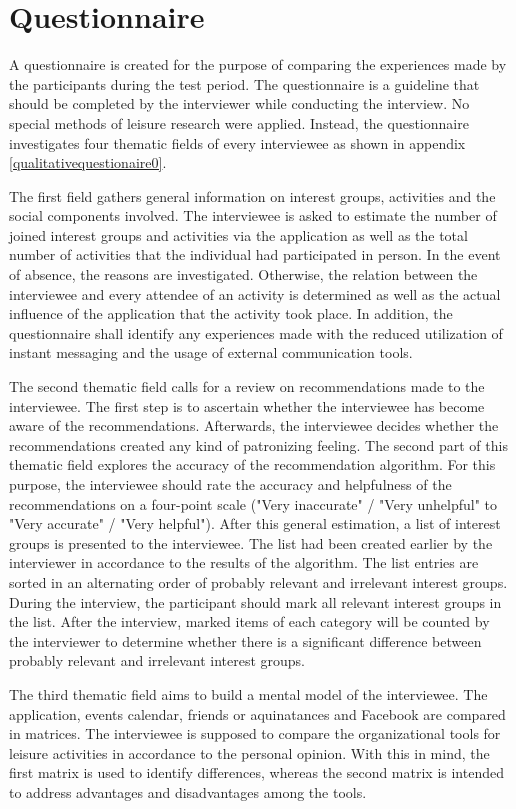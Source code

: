 \documentclass[12pt,numbers=noenddot,parskip,bibliography=totocnumbered,listof=totocnumbered,draft]{scrreprt}
\begin{document}
\section{Questionnaire}
A questionnaire is created for the purpose of comparing the experiences made by the participants during the test period. The questionnaire is a guideline that should be completed by the interviewer while conducting the interview. No special methods of leisure research were applied. Instead, the questionnaire investigates four thematic fields of every interviewee as shown in appendix \ref{qualitativequestionaire0}. 

The first field gathers general information on interest groups, activities and the social components involved. The interviewee is asked to estimate the number of joined interest groups and activities via the application as well as the total number of activities that the individual had participated in person. In the event of absence, the reasons are investigated. Otherwise, the relation between the interviewee and every attendee of an activity is determined as well as the actual influence of the application that the activity took place. In addition, the questionnaire shall identify any experiences made with the reduced utilization of instant messaging and the usage of external communication tools. 

The second thematic field calls for a review on recommendations made to the interviewee. The first step is to ascertain whether the interviewee has become aware of the recommendations. Afterwards, the interviewee decides whether the recommendations created any kind of patronizing feeling. The second part of this thematic field explores the accuracy of the recommendation algorithm. For this purpose, the interviewee should rate the accuracy and helpfulness of the recommendations on a four-point scale ("Very inaccurate" / "Very unhelpful" to "Very accurate" / "Very helpful"). After this general estimation, a list of interest groups is presented to the interviewee. The list had been created earlier by the interviewer in accordance to the results of the algorithm. The list entries are sorted in an alternating order of probably relevant and irrelevant interest groups. During the interview, the participant should mark all relevant interest groups in the list. After the interview, marked items of each category will be counted by the interviewer to determine whether there is a significant difference between probably relevant and irrelevant interest groups.

The third thematic field aims to build a mental model of the interviewee. The application, events calendar, friends or aquinatances and Facebook are compared in matrices. The interviewee is supposed to compare the organizational tools for leisure activities in accordance to the personal opinion. With this in mind, the first matrix is used to identify differences, whereas the second matrix is intended to address advantages and disadvantages among the tools.
\end{document}
